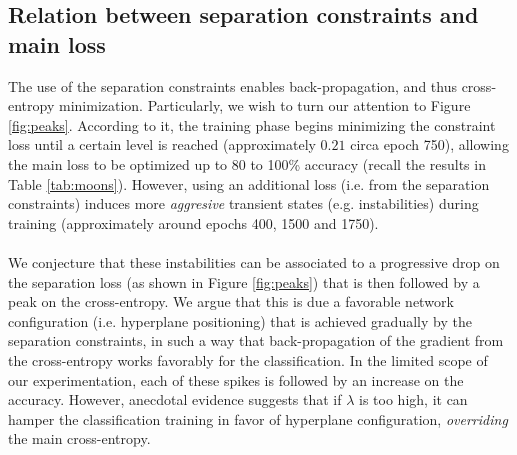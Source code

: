 \subsection{Relation between separation constraints and main loss}\label{subsec:sepvsxent}

The use of the separation constraints enables back-propagation, and thus cross-entropy minimization. Particularly, we wish to turn our attention to Figure \ref{fig:peaks}. According to it, the training phase begins minimizing the constraint loss until a certain level is reached (approximately $0.21$ circa epoch 750), allowing the main loss to be optimized up to 80 to 100\% accuracy (recall the results in Table \ref{tab:moons}). However, using an additional loss (i.e. from the separation constraints) induces more \emph{aggresive} transient states (e.g. instabilities) during training (approximately around epochs 400, 1500 and 1750). 
\\\\
We conjecture that these instabilities can be associated to a progressive drop on the separation loss (as shown in Figure \ref{fig:peaks}) that is then followed by a peak on the cross-entropy. We argue that this is due a favorable network configuration (i.e. hyperplane positioning) that is achieved gradually by the separation constraints, in such a way that back-propagation of the gradient from the cross-entropy works favorably for the classification. In the limited scope of our experimentation, each of these spikes is followed by an increase on the accuracy. However, anecdotal evidence suggests that if $\lambda$ is too high, it can hamper the classification training in favor of hyperplane configuration, \emph{overriding} the main cross-entropy.

